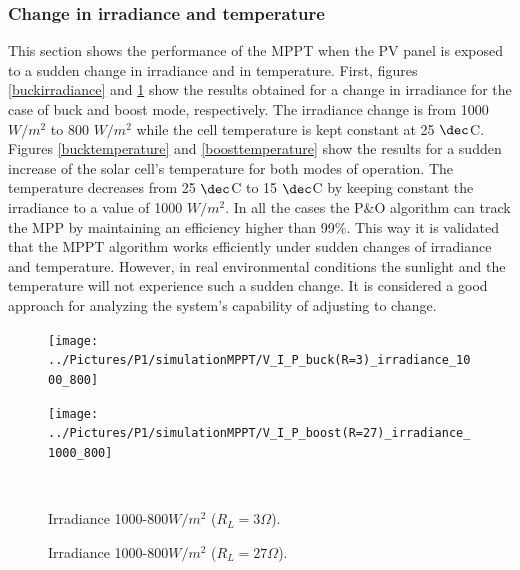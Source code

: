 \subsubsection*{Change in irradiance and temperature}

This section shows the performance of the MPPT when the PV panel is exposed to a sudden change in irradiance and in temperature. First, figures \ref{buckirradiance} and \ref{boostirradiance} show the results obtained for a change in irradiance for the case of buck and boost mode, respectively. The irradiance change is from 1000 $W/ m^2$ to 800 $W/ m^2$ while the cell temperature is kept constant at 25 $\dec$C. 
Figures \ref{bucktemperature} and \ref{boosttemperature}  show the results for a sudden increase of the solar cell's temperature for both modes of operation. The temperature decreases from 25 $\dec$C to 15 $\dec$C by keeping constant the irradiance to a value of 1000 $W/ m^2$. 
In all the cases the P\&O algorithm can track the MPP by maintaining an efficiency higher than 99\%. This way it is validated that the MPPT algorithm works efficiently under sudden changes of irradiance and temperature. However, in real environmental conditions the sunlight and the temperature will not experience such a sudden change. It is considered a good approach for analyzing the system's capability of adjusting to change.

\begin{figure}[H]
	\begin{minipage}[c]{0.6\textwidth}
		\centering
		\texttt{[image: ../Pictures/P1/simulationMPPT/V\_I\_P\_buck(R=3)\_irradiance\_1000\_800]} %
	\end{minipage}%
	\hfill
	\begin{minipage}[c]{0.6\textwidth}
		\centering
		\texttt{[image: ../Pictures/P1/simulationMPPT/V\_I\_P\_boost(R=27)\_irradiance\_1000\_800]} %
	\end{minipage} \\ %
	\begin{minipage}[t]{0.6\textwidth}
		\caption{Irradiance 1000-800$W/ m^2$ ($R_{L}=3\Omega$).} %
		\label{buckirradiance}
	\end{minipage}%
	\hfill
	\begin{minipage}[t]{0.6\textwidth}
		\caption{Irradiance 1000-800$W/ m^2$ ($R_{L}=27\Omega$).} %
		\label{boostirradiance}
	\end{minipage}
\end{figure}



